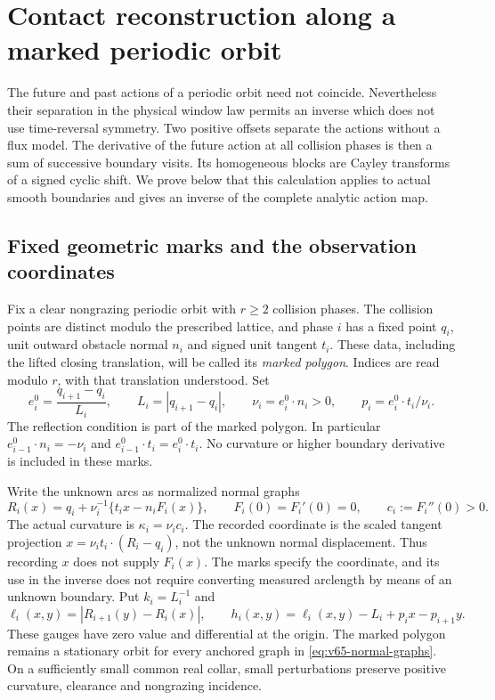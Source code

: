 \section{Contact reconstruction along a marked periodic orbit}
\label{sec:v65-periodic-inverse}

The future and past actions of a periodic orbit need not coincide.
Nevertheless their separation in the physical window law permits an
inverse which does not use time-reversal symmetry.  Two positive offsets
separate the actions without a flux model.  The derivative of the future
action at all collision phases is then a sum of successive boundary
visits.  Its homogeneous blocks are Cayley transforms of a signed cyclic
shift.  We prove below that this calculation applies to actual smooth
boundaries and gives an inverse of the complete analytic action map.

\subsection{Fixed geometric marks and the observation coordinates}

Fix a clear nongrazing periodic orbit with $r\ge2$ collision phases.
The collision points are distinct modulo the prescribed lattice, and
phase $i$ has a fixed point $q_i$, unit outward obstacle normal $n_i$
and signed unit tangent $t_i$.  These data, including the lifted closing
translation, will be called its \emph{marked polygon}.  Indices are read
modulo $r$, with that translation understood.  Set
\[
 e_i^0=\frac{q_{i+1}-q_i}{L_i},\qquad
 L_i=|q_{i+1}-q_i|,\qquad
 \nu_i=e_i^0\cdot n_i>0,\qquad p_i=e_i^0\cdot t_i/\nu_i.
\]
The reflection condition is part of the marked polygon.  In particular
$e_{i-1}^0\cdot n_i=-\nu_i$ and
$e_{i-1}^0\cdot t_i=e_i^0\cdot t_i$.
No curvature or higher boundary derivative is included in these marks.

Write the unknown arcs as normalized normal graphs
\begin{equation}\label{eq:v65-normal-graphs}
 R_i(x)=q_i+\nu_i^{-1}\{t_i x-n_i F_i(x)\},\qquad
 F_i(0)=F_i'(0)=0,\qquad c_i:=F_i''(0)>0.
\end{equation}
The actual curvature is $\kappa_i=\nu_i c_i$.
The recorded coordinate is the scaled tangent projection
$x=\nu_i t_i\cdot(R_i-q_i)$, not the unknown normal displacement.
Thus recording $x$ does not supply $F_i(x)$.  The marks specify the
coordinate, and its use in the inverse does not require converting
measured arclength by means of an unknown boundary.
Put $k_i=L_i^{-1}$ and
\[
 \ell_i(x,y)=|R_{i+1}(y)-R_i(x)|,\qquad
 h_i(x,y)=\ell_i(x,y)-L_i+p_i x-p_{i+1}y.
\]
These gauges have zero value and differential at the origin.
The marked polygon remains a stationary orbit for every anchored graph
in \eqref{eq:v65-normal-graphs}.  On a sufficiently small common real
collar, small perturbations preserve positive curvature, clearance and
nongrazing incidence.

